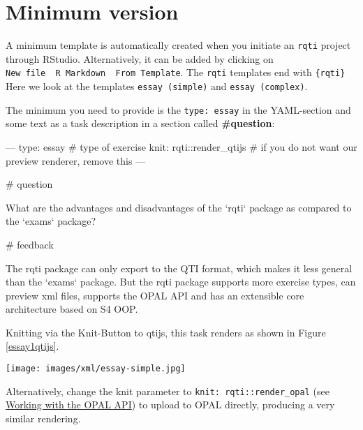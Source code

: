 \documentclass[twoside]{tufte-book}
\newenvironment{Shaded}{}{}
\begin{document}
\section{Minimum version}\label{minimum-version-4}

A minimum template is automatically created when you initiate an \texttt{rqti} project through RStudio. Alternatively, it can be added by clicking on \texttt{New\ file\ \textrightarrow{}\ R\ Markdown\ \textrightarrow{}\ From\ Template}. The \texttt{rqti} templates end with \texttt{\{rqti\}} Here we look at the templates \texttt{essay\ (simple)} and \texttt{essay\ (complex)}.

The minimum you need to provide is the \texttt{type:\ essay} in the YAML-section and some text as a task description in a section called \textbf{\#question}:

\begin{Shaded}
\begin{Highlighting}
---
type: essay # type of exercise
knit: rqti::render_qtijs # if you do not want our preview renderer, remove this
---

# question

What are the advantages and disadvantages of the `rqti` package as compared to
the `exams` package?

# feedback

The rqti package can only export to the QTI format, which makes it less general
than the `exams` package. But the rqti package supports more exercise types, can
preview xml files, supports the OPAL API and has an extensible core architecture
based on S4 OOP.
\end{Highlighting}
\end{Shaded}

Knitting via the Knit-Button to qtijs, this task renders as shown in Figure \ref{essay1qtijs}.

\begin{figure*}
\centering
\texttt{[image: images/xml/essay-simple.jpg]}
\caption{\label{essay1qtijs}Simple essay erxercise rendered by qtijs}
\end{figure*}

\noindent Alternatively, change the knit parameter to \texttt{knit:\ rqti::render\_opal} (see \href{api_opal.html}{Working with the OPAL API}) to upload to OPAL directly, producing a very similar rendering.
%
\end{document}
